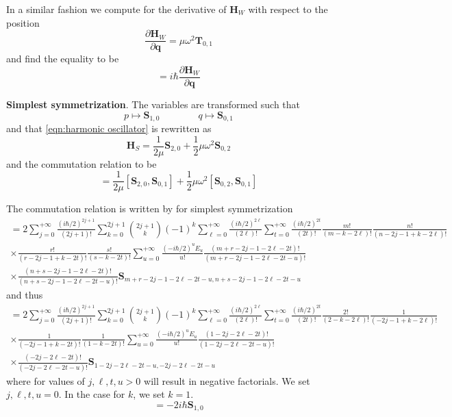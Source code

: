 \documentclass[a4paper]{article}
\theoremstyle{definition}
\begin{document}
In a similar fashion we compute for the derivative of $\textbf{H}_W$ with respect to the position
\begin{equation}
	\frac{\partial\textbf{H}_W}{\partial\textbf{q}}=\mu\omega^2\textbf{T}_{0,1}
\end{equation}
and find the equality to be
\begin{equation}
	[\textbf{H}_W,\textbf{p}]=i\hbar\frac{\partial\textbf{H}_W}{\partial\textbf{q}}
\end{equation}

\textbf{Simplest symmetrization}. The variables are transformed such that
\begin{equation}
	p\mapsto\textbf{S}_{1,0}\qquad\qquad q\mapsto\textbf{S}_{0,1}
\end{equation}
and that \ref{eqn:harmonic oscillator} is rewritten as
\begin{equation}
	\textbf{H}_S=\frac{1}{2\mu}\textbf{S}_{2,0}+\frac{1}{2}\mu\omega^2\textbf{S}_{0,2}
\end{equation}
and the commutation relation to be
\begin{equation}
	[\textbf{H}_S,\textbf{S}_{0,1}]=\frac{1}{2\mu}[\textbf{S}_{2,0},\textbf{S}_{0,1}]+\frac{1}{2}\mu\omega^2[\textbf{S}_{0,2},\textbf{S}_{0,1}]
\end{equation}

The commutation relation is written by \cite{Domingo2015} for simplest symmetrization
\begin{multline}
	[\textbf{S}_{m,n},\textbf{S}_{r,s}]=2\sum_{j=0}^{+\infty}\frac{(i\hbar/2)^{2j+1}}{(2j+1)!}\sum_{k=0}^{2j+1}\binom{2j+1}{k}(-1)^k\sum_{\ell=0}^{+\infty}\frac{(i\hbar/2)^{2\ell}}{(2\ell)!}\sum_{t=0}^{+\infty}\frac{(i\hbar/2)^{2t}}{(2t)!}\frac{m!}{(m-k-2\ell)!}\frac{n!}{(n-2j-1+k-2\ell)!}\\\times\frac{r!}{(r-2j-1+k-2t)!}\frac{s!}{(s-k-2t)!}\sum_{u=0}^{+\infty}\frac{(-i\hbar/2)^uE_u}{u!}\frac{(m+r-2j-1-2\ell-2t)!}{(m+r-2j-1-2\ell-2t-u)!}\\\times\frac{(n+s-2j-1-2\ell-2t)!}{(n+s-2j-1-2\ell-2t-u)!}\textbf{S}_{m+r-2j-1-2\ell-2t-u,n+s-2j-1-2\ell-2t-u}
\end{multline}
and thus
\begin{multline}
	[\textbf{S}_{2,0},\textbf{S}_{0,1}]=2\sum_{j=0}^{+\infty}\frac{(i\hbar/2)^{2j+1}}{(2j+1)!}\sum_{k=0}^{2j+1}\binom{2j+1}{k}(-1)^k\sum_{\ell=0}^{+\infty}\frac{(i\hbar/2)^{2\ell}}{(2\ell)!}\sum_{t=0}^{+\infty}\frac{(i\hbar/2)^{2t}}{(2t)!}\frac{2!}{(2-k-2\ell)!}\frac{1}{(-2j-1+k-2\ell)!}\\\times\frac{1}{(-2j-1+k-2t)!}\frac{1}{(1-k-2t)!}\sum_{u=0}^{+\infty}\frac{(-i\hbar/2)^uE_u}{u!}\frac{(1-2j-2\ell-2t)!}{(1-2j-2\ell-2t-u)!}\\\times\frac{(-2j-2\ell-2t)!}{(-2j-2\ell-2t-u)!}\textbf{S}_{1-2j-2\ell-2t-u,-2j-2\ell-2t-u}
\end{multline}
where for values of $j,\ell,t,u>0$ will result in negative factorials. We set $j,\ell,t,u=0$. In the case for $k$, we set $k=1$.
\begin{equation}
	[\textbf{S}_{2,0},\textbf{S}_{0,1}]=-2i\hbar\textbf{S}_{1,0}
\end{equation}
\end{document}
